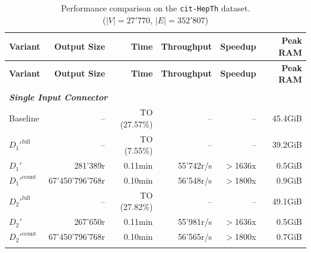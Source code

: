 \begin{longtable}{lrrrrr}
    
    \caption[cit-HepTh Performance Comparison]{Performance comparison on the \texttt{cit-HepTh} dataset. \\ ($|V| = 27'770$, $|E| = 352'807$)}
    \label{tab:results_cit-HepTh} \\

    \toprule
    \textbf{Variant}      & \textbf{Output Size}  & \textbf{Time}       & \textbf{Throughput}   & \textbf{Speedup}  & \textbf{Peak RAM} \\
    \midrule
    \endfirsthead 

    \toprule
    \textbf{Variant}      & \textbf{Output Size}  & \textbf{Time}       & \textbf{Throughput}   & \textbf{Speedup}  & \textbf{Peak RAM} \\
    \midrule
    \endhead 

    \bottomrule
    \endfoot  

    \endlastfoot 

    
    \multicolumn{6}{l}{\textit{5 Path Query}} \\
    \midrule
    \multicolumn{6}{l}{\textit{\textbf{Single Input Connector}}} \\
    \nopagebreak
    Baseline              &  --                   &  TO (27.57\%)    &  --                 & --                & 45.4GiB   \\
    $D_1'^{\text{full}}$   &  --                   &  TO (7.55\%)     &  --                 & --                & 39.2GiB   \\
    \quad $D_1'$           &  281'389r             &  0.11min         &  55'742r/s          & $>$1636x           & 0.5GiB    \\
    $D_1'^{\text{count}}$  &  67'450'796'768r      &  0.10min         &  56'548r/s          & $>$1800x           & 0.9GiB    \\
    $D_2'^{\text{full}}$   &  --                   &  TO (27.82\%)    &  --                 & --                & 49.1GiB   \\
    \quad $D_2'$           &  267'650r             &  0.11min         &  55'981r/s          & $>$1636x           & 0.5GiB    \\
    $D_2'^{\text{count}}$  &  67'450'796'768r      &  0.10min         &  56'565r/s          & $>$1800x           & 0.7GiB    \\
    \addlinespace
    

\end{longtable}
